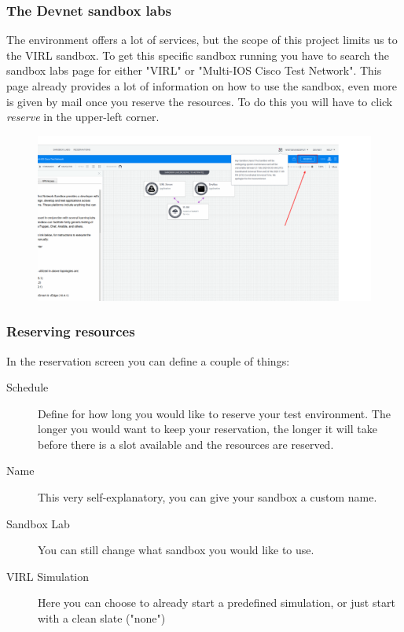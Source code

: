 \documentclass{article}
\begin{document}
\subsubsection{The Devnet sandbox labs}
The environment offers a lot of services,
but the scope of this project limits us to the VIRL sandbox.
To get this specific sandbox running you have to search the sandbox labs page for either "VIRL" or "Multi-IOS Cisco Test Network".
This page already provides a lot of information on how to use the sandbox,
even more is given by mail once you reserve the resources.
To do this you will have to click \textit{reserve} in the upper-left corner.

\begin{figure}[H]
	\centering
	\includegraphics[width=\textwidth]{images/Devnet_Sandbox_VIRL.png}
\end{figure}

\subsubsection{Reserving resources}
In the reservation screen you can define a couple of things:

\begin{description}
	\item[Schedule] Define for how long you would like to reserve your test environment.
		The longer you would want to keep your reservation,
		the longer it will take before there is a slot available and the resources are reserved.
	\item[Name] This very self-explanatory, you can give your sandbox a custom name.
	\item[Sandbox Lab] You can still change what sandbox you would like to use.
	\item[VIRL Simulation] Here you can choose to already start a predefined simulation,
		or just start with a clean slate ("none")
\end{description}
\end{document}
